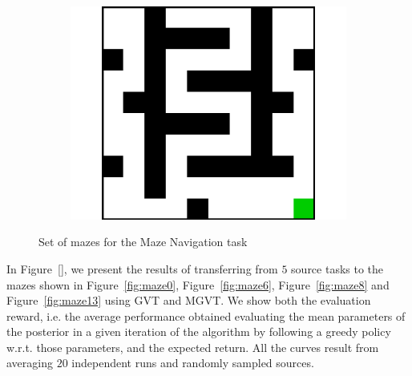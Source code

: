 \documentclass{article}
\begin{document}
\begin{figure}[t]
\begin{subfigure}[t]{0.18\textwidth}
    \includegraphics[width=\textwidth]{images/maze/maze19.pdf}
    \caption{}
  \end{subfigure}
  \caption{Set of mazes for the Maze Navigation task}
  \label{fig:mazes}
\end{figure}

In Figure~\ref{}, we present the results of transferring from $5$ source tasks to the mazes shown in Figure~\ref{fig:maze0}, Figure~\ref{fig:maze6}, Figure~\ref{fig:maze8} and Figure~\ref{fig:maze13} using  GVT and MGVT. We show both the evaluation reward, i.e. the average performance obtained evaluating the mean parameters of the posterior in a given iteration of the algorithm by following a greedy policy w.r.t. those parameters, and the expected return. All the curves result from averaging $20$ independent runs and randomly sampled sources.
\end{document}
